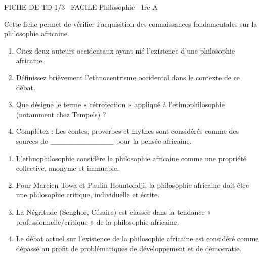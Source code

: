 \documentclass[11pt]{article}
\begin{document}
\begin{tcolorbox}[enhanced,colback=popink,colframe=popink,arc=10pt,boxrule=0pt,left=12pt,right=12pt,top=9pt,bottom=9pt]
{\color{white}\popxbold\small FICHE DE TD 1/3 \textbullet\ FACILE \hfill Philosophie \textbullet\ 1re A\par}
\end{tcolorbox}
\vspace{4pt}
Cette fiche permet de vérifier l'acquisition des connaissances fondamentales sur la philosophie africaine.

\begin{exercice}
\begin{enumerate}
    \item Citez deux auteurs occidentaux ayant nié l'existence d'une philosophie africaine.
    \item Définissez brièvement l'ethnocentrisme occidental dans le contexte de ce débat.
    \item Que désigne le terme « rétrojection » appliqué à l'ethnophilosophie (notamment chez Tempels) ?
    \item Complétez : Les contes, proverbes et mythes sont considérés comme des sources de \_\_\_\_\_\_\_\_\_\_\_\_ pour la pensée africaine.
\end{enumerate}
\end{exercice}

\begin{exercice}
\begin{enumerate}
    \item L'ethnophilosophie considère la philosophie africaine comme une propriété collective, anonyme et immuable.
    \item Pour Marcien Towa et Paulin Hountondji, la philosophie africaine doit être une philosophie critique, individuelle et écrite.
    \item La Négritude (Senghor, Césaire) est classée dans la tendance « professionnelle/critique » de la philosophie africaine.
    \item Le débat actuel sur l'existence de la philosophie africaine est considéré comme dépassé au profit de problématiques de développement et de démocratie.
\end{enumerate}
\end{exercice}
\end{document}
